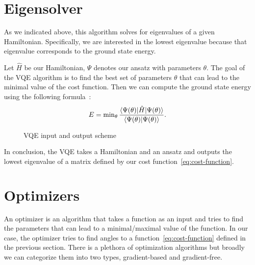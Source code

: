\section{Eigensolver}
As we indicated above, this algorithm solves for eigenvalues of a given Hamiltonian. Specifically, we are interested in the lowest eigenvalue because that eigenvalue corresponds to the ground state energy. 

Let $\hat{H}$ be our Hamiltonian, $\Psi$ denotes our ansatz with parameters $\theta$. The goal of the VQE algorithm is to find the best set of parameters $\theta$ that can lead to the minimal value of the cost function. Then we can compute the ground state energy using the following formula~\cite{fedorov2021vqe}:
\begin{equation} \label{eq:cost-function}
E = \min\nolimits_{\theta} \frac{\langle\Psi(\theta)\rvert\hat{H}\lvert\Psi(\theta)\rangle}{\langle\Psi(\theta)\vert\Psi(\theta)\rangle} \text{.}
\end{equation}

\begin{figure}[H] 
    \caption{VQE input and output scheme}
\end{figure}

In conclusion, the VQE takes a Hamiltonian and an ansatz and outputs the lowest eigenvalue of a matrix defined by our cost function~\ref{eq:cost-function}.

\section{Optimizers}
An optimizer is an algorithm that takes a function as an input and tries to find the parameters that can lead to a minimal/maximal value of the function. In our case, the optimizer tries to find angles to a function~\ref{eq:cost-function} defined in the previous section. There is a plethora of optimization algorithms but broadly we can categorize them into two types, gradient-based and gradient-free.

